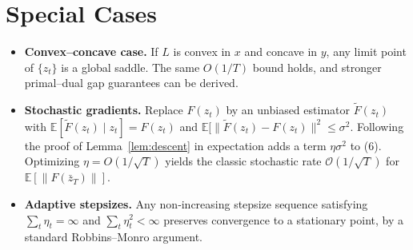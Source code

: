 \documentclass{article}
\newcommand{\E}{\mathbb{E}}
\begin{document}
\section*{Special Cases}
\begin{itemize}
\item \textbf{Convex–concave case.} If \(L\) is convex in \(x\) and concave in \(y\), any limit point of \(\{z_t\}\) is a global saddle. The same \(O(1/T)\) bound holds, and stronger primal–dual gap guarantees can be derived.
\item \textbf{Stochastic gradients.} Replace \(F(z_t)\) by an unbiased estimator \(\tilde F(z_t)\) with \(\E[\tilde F(z_t)\mid z_t]=F(z_t)\) and \(\E[\|\tilde F(z_t)-F(z_t)\|^{2}\le\sigma^{2}\). Following the proof of Lemma~\ref{lem:descent} in expectation adds a term \(\eta\sigma^{2}\) to (6). Optimizing \(\eta=O(1/\sqrt{T})\) yields the classic stochastic rate \(\mathcal{O}(1/\sqrt{T})\) for \(\E[\|F(\bar z_T)\|]\).
\item \textbf{Adaptive stepsizes.} Any non‑increasing stepsize sequence satisfying \(\sum_{t}\eta_t=\infty\) and \(\sum_{t}\eta_t^{2}<\infty\) preserves convergence to a stationary point, by a standard Robbins–Monro argument.
\end{itemize}
\end{document}
